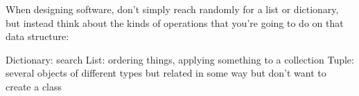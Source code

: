 When designing software, don't simply reach randomly for a list or dictionary, but instead think about the kinds of operations that you're going to do on that data structure: 

Dictionary: search
List: ordering things, applying something to a collection
Tuple: several objects of different types but related in some way but don't want to create a class
